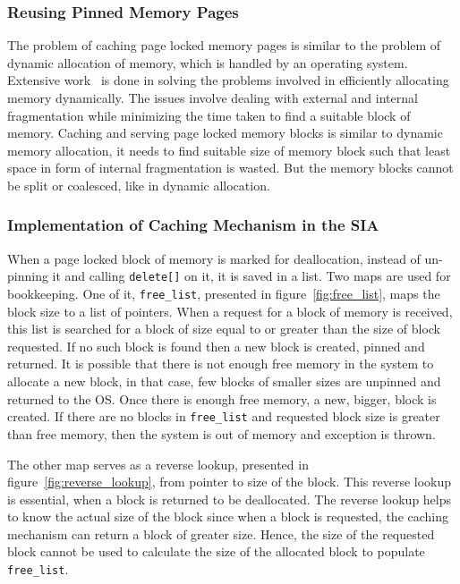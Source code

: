 \subsubsection{Reusing Pinned Memory Pages}
The problem of caching page locked memory pages is similar to the problem of dynamic
allocation of memory, which is handled by an operating system. Extensive work~\cite{Wilson1995}
is done in solving the problems involved in efficiently allocating memory dynamically.
The issues involve dealing with external and internal fragmentation while minimizing
the time taken to find a suitable block of memory. Caching and serving page locked memory blocks
is similar to dynamic memory allocation, it needs to find suitable size of
memory block such that least space in form of internal fragmentation is wasted.
But the memory blocks cannot be split or coalesced, like in dynamic allocation.

\subsubsection{Implementation of Caching Mechanism in the SIA}\label{sec:cachingmech}
When a page locked block of memory is marked for deallocation, instead of un-pinning it and calling
\texttt{delete[]} on it, it is saved in a list. Two maps are used for bookkeeping.
One of it, \texttt{free\_list}, presented in figure~\ref{fig:free_list},
maps the block size to a list of pointers. When a request for
a block of memory is received, this list is searched for a block of size equal to or
greater than the size of block requested. If no such block is found then a new block
is created, pinned and returned. It is possible that there is not enough free
memory in the system to allocate a new block, in that case, few blocks of smaller
sizes are unpinned and returned to the OS. Once there is enough free memory, a new,
bigger, block is created. If there
are no blocks in \texttt{free\_list} and requested block size is greater than free memory,
then the system is out of memory and exception is thrown.

The other map serves as a reverse lookup, presented in figure~\ref{fig:reverse_lookup},
from pointer to size of the block. This reverse lookup is essential, when a block is
returned to be deallocated. The reverse lookup helps to know the actual size of the block
since when a block is requested, the caching mechanism can return a block of greater
size.  Hence, the size of the requested block cannot be used to calculate the size
of the allocated block to populate \texttt{free\_list}.

